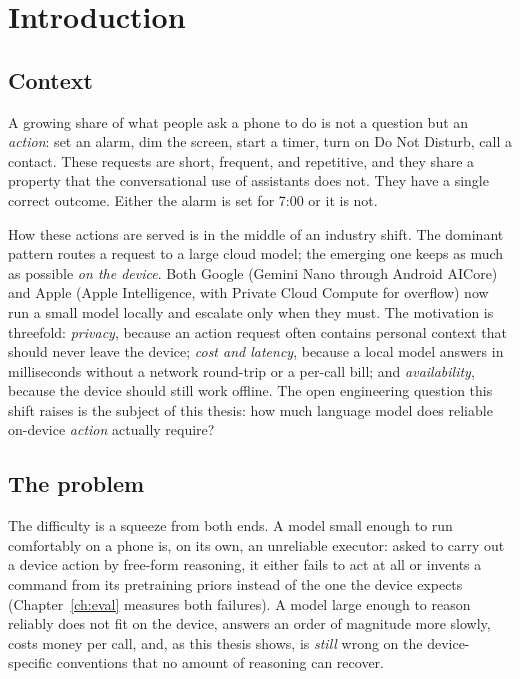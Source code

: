 \chapter{Introduction}
\label{ch:intro}

\section{Context}
\label{sec:context}

A growing share of what people ask a phone to do is not a question but an
\emph{action}: set an alarm, dim the screen, start a timer, turn on Do Not
Disturb, call a contact. These requests are short, frequent, and repetitive, and
they share a property that the conversational use of assistants does not. They
have a single correct outcome. Either the alarm is set for 7:00 or it is not.

How these actions are served is in the middle of an industry shift. The dominant
pattern routes a request to a large cloud model; the emerging one keeps as much
as possible \emph{on the device}. Both Google (Gemini Nano through Android
AICore) and Apple (Apple Intelligence, with Private Cloud Compute for overflow)
now run a small model locally and escalate only when they must. The motivation is
threefold: \emph{privacy}, because an action request often contains personal
context that should never leave the device; \emph{cost and latency}, because a
local model answers in milliseconds without a network round-trip or a per-call
bill; and \emph{availability}, because the device should still work offline. The
open engineering question this shift raises is the subject of this thesis: how
much language model does reliable on-device \emph{action} actually require?

\section{The problem}
\label{sec:problem}

The difficulty is a squeeze from both ends. A model small enough to run
comfortably on a phone is, on its own, an unreliable executor: asked to carry out
a device action by free-form reasoning, it either fails to act at all or invents
a command from its pretraining priors instead of the one the device expects
(Chapter~\ref{ch:eval} measures both failures). A model large enough to reason
reliably does not fit on the device, answers an order of magnitude more slowly,
costs money per call, and, as this thesis shows, is \emph{still} wrong on the
device-specific conventions that no amount of reasoning can recover.


